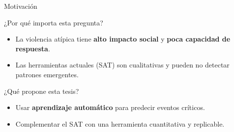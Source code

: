 \begin{frame}{Motivación}
    \small
    \begin{block}{¿Por qué importa esta pregunta?}
        \begin{itemize}
            \item La violencia atípica tiene \textbf{alto impacto social} y \textbf{poca capacidad de respuesta}.
            \item Las herramientas actuales (SAT) son cualitativas y pueden no detectar patrones emergentes.
        \end{itemize}
    \end{block}
    
    \begin{block}{¿Qué propone esta tesis?}
        \begin{itemize}
            \item Usar \textbf{aprendizaje automático} para predecir eventos críticos.
            \item Complementar el SAT con una herramienta cuantitativa y replicable.
        \end{itemize}
    \end{block}

\end{frame}

        
        
